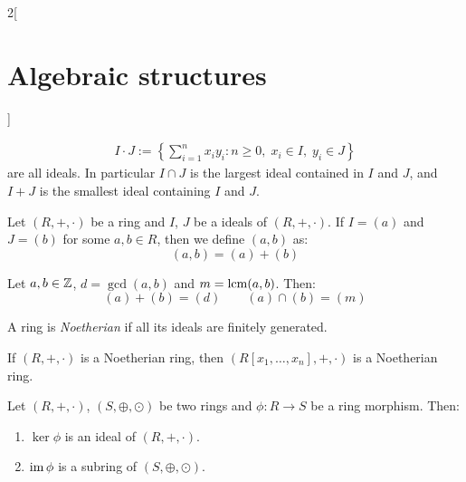 \documentclass[../../../main.tex]{subfiles}
\begin{document}
\begin{multicols}{2}[\section{Algebraic structures}]
\begin{prop}
\begin{gather*}
            I\cdot J:=\left\{\sum_{i=1}^nx_iy_i:n\geq 0,\;x_i\in I,\;y_i\in J\right\}
        \end{gather*}
        are all ideals. In particular $I\cap J$ is the largest ideal contained in $I$ and $J$, and $I+J$ is the smallest ideal containing $I$ and $J$.
    \end{prop}
    \begin{definition}
        Let $(R,+,\cdot)$ be a ring and $I$, $J$ be a ideals of $(R,+,\cdot)$. If $I=(a)$ and $J=(b)$ for some $a,b\in R$, then we define $(a,b)$ as: $$(a,b)=(a)+(b)$$
    \end{definition}
    \begin{prop}
        Let $a,b\in\mathbb{Z}$, $d=\gcd(a,b)$ and $m=\operatorname{lcm}(a,b)$. Then: $$(a)+(b)=(d)\qquad(a)\cap(b)=(m)$$
    \end{prop}
    \begin{definition}
        A ring is \textit{Noetherian} if all its ideals are finitely generated.
    \end{definition}
    \begin{theorem}
        If $(R,+,\cdot)$ is a Noetherian ring, then $(R[x_1,\ldots,x_n],+,\cdot)$ is a Noetherian ring.
    \end{theorem}
    \begin{lemma}
        Let $(R,+,\cdot)$, $(S,\oplus,\odot)$ be two rings and $\phi:R\rightarrow S$ be a ring morphism. Then:
        \begin{enumerate}
            \item $\ker\phi$ is an ideal of $(R,+,\cdot)$.
            \item $\operatorname{im}\phi$ is a subring of $(S,\oplus,\odot)$.
        \end{enumerate}
    \end{lemma}

\end{multicols}
\end{document}
